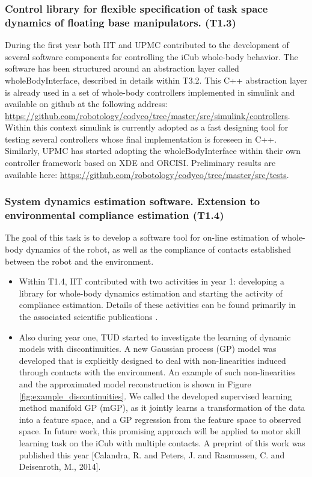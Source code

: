 \documentclass[12pt,a4paper,twoside]{article}
\begin{document}
\subsubsection{Control library for flexible specification of task space dynamics of floating base manipulators. (T1.3)}

During the first year both IIT and UPMC contributed to the development of several software components for controlling the iCub whole-body behavior. The software has been structured around an abstraction layer called wholeBodyInterface, described in details within T3.2. This C++ abstraction layer is already used in a set of whole-body controllers implemented in simulink and available on github at the following address: \url{https://github.com/robotology/codyco/tree/master/src/simulink/controllers}. Within this context simulink is currently adopted as a fast designing tool for testing several controllers whose final implementation is foreseen in C++. Similarly, UPMC has started adopting the wholeBodyInterface within their own
controller framework based on XDE and ORCISI. Preliminary results are available here: \url{https://github.com/robotology/codyco/tree/master/src/tests}. 

\subsubsection{System dynamics estimation software. Extension to
environmental compliance estimation (T1.4)}

The goal of this task is to develop a software tool for on-line estimation of whole-body dynamics of the robot, as well as the compliance of contacts established between the robot and the environment. 

\begin{itemize}
\item Within T1.4, IIT contributed with two activities in year 1: developing a library for whole-body dynamics estimation and starting the activity of compliance estimation. Details of these activities can be found primarily in the associated scientific publications \cite{Traversaro2013, Traversaro2014, Fiorio2014}.

\item Also during year one, TUD started to investigate the learning of dynamic models with
discontinuities. A new Gaussian process (GP) model was developed
that is explicitly designed to deal with non-linearities
induced through contacts with the environment. An example of such non-linearities 
and the approximated model reconstruction is shown in Figure \ref{fig:example_discontinuities}.
We called the developed supervised learning method manifold GP (mGP), as it 
jointly learns a transformation of the data into a feature space, and a GP regression 
 from the feature space to observed space. In future work, this promising approach 
 will be applied to motor skill learning task on the iCub with multiple contacts. 
 A preprint of this work 
 was published this year [Calandra, R. and Peters, J. and Rasmussen, C. and Deisenroth,
M., 2014].
\end{itemize}
\end{document}
